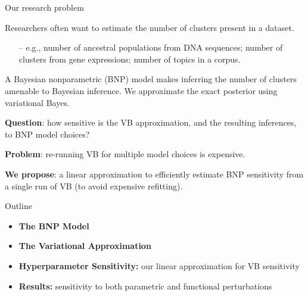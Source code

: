 \documentclass[10pt]{beamer}\usepackage[]{graphicx}\usepackage[]{color}
\begin{document}
\begin{frame}{Our research problem}

Researchers often want to estimate the number of clusters present in a dataset. 
\vspace{-0.1in}
\pause
\begin{itemize}
\item[--] e.g., number of ancestral populations from DNA sequences; number of clusters from gene expressions; number of topics in a corpus. 
\end{itemize}

\pause

A Bayesian nonparametric (BNP) model makes inferring the number of clusters amenable to
Bayesian inference. We approximate the exact posterior using variational Bayes. 

\pause

\textbf{Question}: how sensitive is the VB approximation, and the resulting
inferences, to BNP model choices?

\pause 

\textbf{Problem}: re-running VB for multiple model choices is expensive. 

\pause 

\textbf{We propose}: a linear approximation to efficiently
estimate BNP sensitivity from a single run of VB (to avoid
expensive refitting). 

\end{frame}

\begin{frame}{Outline}
\begin{itemize}
\item {\bf The BNP Model}
\vspace{0.1in}

\item {\bf The Variational Approximation}
\vspace{0.1in}

\item {\bf Hyperparameter Sensitivity:} our linear approximation for VB sensitivity
\vspace{0.1in}

\item {\bf Results:} sensitivity to both parametric and functional perturbations
\vspace{0.1in}

\end{itemize}
\end{frame}
\end{document}
